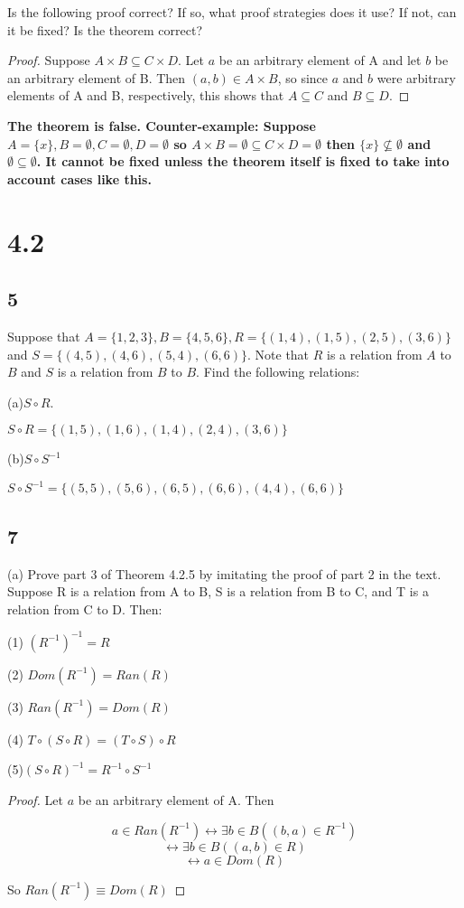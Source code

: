 \documentclass{article}
\begin{document}
Is the following proof correct? If so, what proof strategies does it use? If not, can it be fixed? Is the theorem correct?

\begin{proof}
Suppose $A \times B \subseteq C \times D$. Let $a$ be an arbitrary element of A and let $b$ be an arbitrary element of B. Then $(a,b)\in A \times B$, so since $a$ and $b$ were arbitrary elements of A and B, respectively, this shows that $A \subseteq C$ and $B \subseteq D$.
\end{proof}

\textbf{The theorem is false. Counter-example:  Suppose $A=\{x\}, B=\emptyset, C=\emptyset, D=\emptyset$ so $A \times B= \emptyset \subseteq C \times D = \emptyset  $ then $\{x\}\nsubseteq \emptyset$ and $\emptyset \subseteq \emptyset$. It cannot be fixed unless the theorem itself is fixed to take into account cases like this.}

\section{4.2}
\subsection{5}
Suppose that $A = \{1,2,3\}, B = \{4,5,6 \},R = \{(1,4), (1,5),(2,5),(3,6)\}$ and $S=\{(4,5),(4,6),(5,4),(6,6)\}$. Note that $R$ is a relation from $A$ to $B$ and $S$ is a relation from $B$ to $B$. Find the following relations:

(a)$S \circ R$.

$S \circ R=\{(1,5),(1,6),(1,4),(2,4),(3,6)\}$


(b)$S \circ S^{-1}$

$S \circ S^{-1}= \{(5,5),(5,6),(6,5),(6,6),(4,4),(6,6)\}$
\newpage
\subsection{7}
(a) Prove part 3 of Theorem 4.2.5 by imitating the proof of part 2 in the text.
Suppose R is a relation from A to B, S is a relation from B to C, and T is a relation from C to D. Then:


(1) $(R^{-1})^{-1}=R$


(2) $Dom(R^{-1})= Ran(R)$


(3) $Ran(R^{-1})=Dom(R)$

(4) $T \circ (S \circ R)= (T \circ S) \circ R$

(5)$(S \circ R)^{-1}= R^{-1} \circ S^{-1}$
\begin{proof}
    Let $a$ be an arbitrary element of A. Then 

    $$a \in Ran(R^{-1}) \leftrightarrow \exists b \in B ((b,a)\in R^{-1})$$
    $$ \leftrightarrow \exists b \in B((a,b)\in R)$$
    $$\leftrightarrow a \in Dom(R)$$

    So $Ran(R^{-1}) \equiv Dom(R)$
\end{proof}
\end{document}
